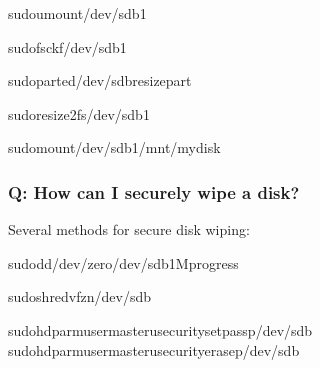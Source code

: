 \documentclass[letterpaper,10pt,english]{sphinxmanual}
\begin{document}
\begin{sphinxVerbatim}[commandchars=\\\{\}]
sudoumount/dev/sdb1

sudofsck\PYGZhy{}f/dev/sdb1

sudoparted/dev/sdbresizepart\PYGZpc{}

sudoresize2fs/dev/sdb1

sudomount/dev/sdb1/mnt/mydisk
\end{sphinxVerbatim}


\subsubsection{Q: How can I securely wipe a disk?}
\label{\detokenize{disk-management:q-how-can-i-securely-wipe-a-disk}}
\sphinxAtStartPar
{} Several methods for secure disk wiping:

\begin{sphinxVerbatim}[commandchars=\\\{\}]
sudodd/dev/zero/dev/sdb1Mprogress

sudoshred\PYGZhy{}vfz\PYGZhy{}n/dev/sdb


sudohdparm\PYGZhy{}\PYGZhy{}user\PYGZhy{}masteru\PYGZhy{}\PYGZhy{}security\PYGZhy{}set\PYGZhy{}passp/dev/sdb
sudohdparm\PYGZhy{}\PYGZhy{}user\PYGZhy{}masteru\PYGZhy{}\PYGZhy{}security\PYGZhy{}erasep/dev/sdb
\end{sphinxVerbatim}
\end{document}
